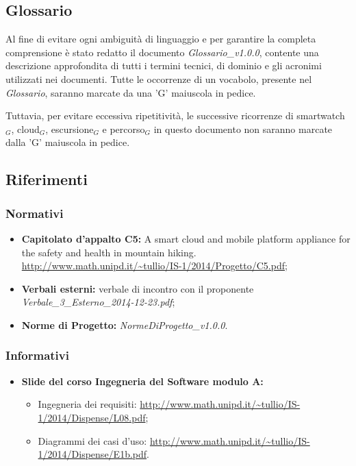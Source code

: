 \subsection{Glossario}
Al fine di evitare ogni ambiguità di linguaggio e per garantire la completa comprensione è stato redatto il documento \textit{Glossario\_v1.0.0}, contente una descrizione approfondita di tutti i termini tecnici, di dominio e gli acronimi utilizzati nei documenti. Tutte le occorrenze di un vocabolo, presente nel \textit{Glossario}, saranno marcate da una 'G' maiuscola in pedice.

Tuttavia, per evitare eccessiva ripetitività, le successive ricorrenze di smartwatch$_{G}$, cloud$_{G}$, escursione$_{G}$ e percorso$_{G}$ in questo documento non saranno marcate dalla 'G' maiuscola in pedice.


\subsection{Riferimenti}
\subsubsection{Normativi}
\begin{itemize}
\item \textbf{Capitolato d'appalto C5:} \CAPITOLATO{} A smart cloud and mobile platform appliance for the safety and health in mountain hiking. \\
\url{http://www.math.unipd.it/~tullio/IS-1/2014/Progetto/C5.pdf};
\item \textbf{Verbali esterni:} verbale di incontro con il proponente {\itshape Verbale\_3\_Esterno\_2014-12-23.pdf}; 
\item \textbf{Norme di Progetto:} {\itshape NormeDiProgetto\_v1.0.0}.
\end{itemize} 

\subsubsection{Informativi}
\begin{itemize}
\item \textbf{Slide del corso Ingegneria del Software modulo A:}
\begin{itemize}
\item Ingegneria dei requisiti: \url{http://www.math.unipd.it/~tullio/IS-1/2014/Dispense/L08.pdf};
\item Diagrammi dei casi d'uso: \url{http://www.math.unipd.it/~tullio/IS-1/2014/Dispense/E1b.pdf}.
\end{itemize}
\end{itemize}

